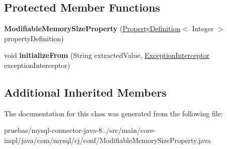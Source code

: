 \subsection*{Protected Member Functions}
\begin{DoxyCompactItemize}
\item 
\mbox{\label{classcom_1_1mysql_1_1cj_1_1conf_1_1_modifiable_memory_size_property_a8c539df40fdc2f01f6b87657be07de89}} 
{\bfseries Modifiable\+Memory\+Size\+Property} (\mbox{\hyperlink{interfacecom_1_1mysql_1_1cj_1_1conf_1_1_property_definition}{Property\+Definition}}$<$ Integer $>$ property\+Definition)
\item 
\mbox{\label{classcom_1_1mysql_1_1cj_1_1conf_1_1_modifiable_memory_size_property_aceb3ed567e0a632125e731f9690d3277}} 
void {\bfseries initialize\+From} (String extracted\+Value, \mbox{\hyperlink{interfacecom_1_1mysql_1_1cj_1_1exceptions_1_1_exception_interceptor}{Exception\+Interceptor}} exception\+Interceptor)
\end{DoxyCompactItemize}
\subsection*{Additional Inherited Members}


The documentation for this class was generated from the following file\+:\begin{DoxyCompactItemize}
\item 
pruebas/mysql-\/connector-\/java-\/8../src/main/core-\/impl/java/com/mysql/cj/conf/Modifiable\+Memory\+Size\+Property.\+java\end{DoxyCompactItemize}
